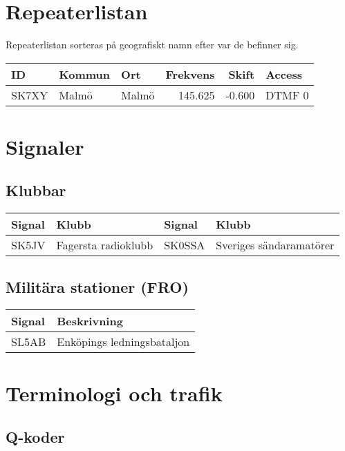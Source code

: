 \documentclass[10pt,swedish,a4paper]{article}
\begin{document}
\section{Repeaterlistan}

Repeaterlistan sorteras på geografiskt namn efter var de befinner sig.

\begin{tabular}{lllrrl}
	\textbf{ID} & \textbf{Kommun} & \textbf{Ort} & \textbf{Frekvens} & \textbf{Skift} & \textbf{Access} \\ \hline
	SK7XY       & Malmö           & Malmö        &           145.625 &         -0.600 & DTMF 0
\end{tabular}





\section{Signaler}

\subsection{Klubbar}

\small
\begin{longtable}{ll|ll}
	\textbf{Signal} & \textbf{Klubb}      & \textbf{Signal} & \textbf{Klubb}          \\ \hline
	SK5JV           & Fagersta radioklubb & SK0SSA          & Sveriges sändaramatörer
\end{longtable}
\normalsize

\subsection{Militära stationer (FRO)}

\begin{tabular}{ll}
	\textbf{Signal} & \textbf{Beskrivning}       \\ \hline
	SL5AB           & Enköpings ledningsbataljon
\end{tabular}

\section{Terminologi och trafik}

\subsection{Q-koder}
\end{document}
